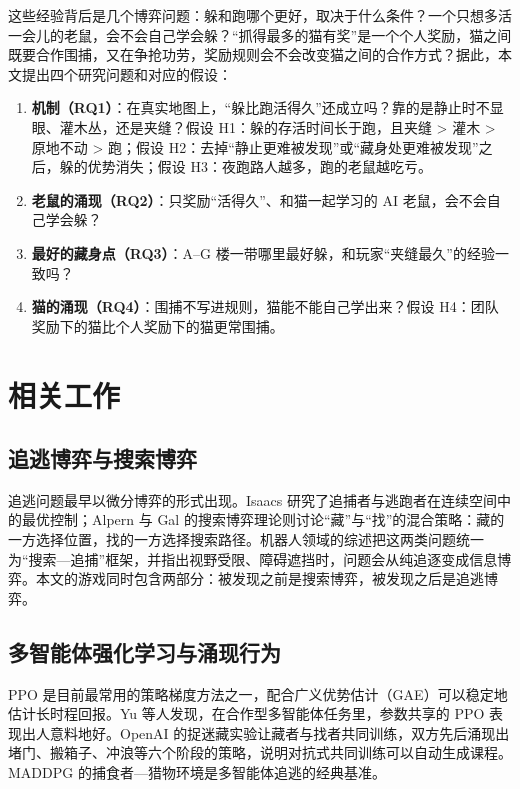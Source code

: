 \documentclass[a4paper,zihao=5,fontset=fandol,UTF8]{ctexart}
\begin{document}
这些经验背后是几个博弈问题：躲和跑哪个更好，取决于什么条件？一个只想多活一会儿的老鼠，会不会自己学会躲？“抓得最多的猫有奖”是一个个人奖励，猫之间既要合作围捕，又在争抢功劳，奖励规则会不会改变猫之间的合作方式？据此，本文提出四个研究问题和对应的假设：

\begin{enumerate}
  \item \textbf{机制（RQ1）}：在真实地图上，“躲比跑活得久”还成立吗？靠的是静止时不显眼、灌木丛，还是夹缝？假设 H1：躲的存活时间长于跑，且夹缝 > 灌木 > 原地不动 > 跑；假设 H2：去掉“静止更难被发现”或“藏身处更难被发现”之后，躲的优势消失；假设 H3：夜跑路人越多，跑的老鼠越吃亏。
  \item \textbf{老鼠的涌现（RQ2）}：只奖励“活得久”、和猫一起学习的 AI 老鼠，会不会自己学会躲？
  \item \textbf{最好的藏身点（RQ3）}：A–G 楼一带哪里最好躲，和玩家“夹缝最久”的经验一致吗？
  \item \textbf{猫的涌现（RQ4）}：围捕不写进规则，猫能不能自己学出来？假设 H4：团队奖励下的猫比个人奖励下的猫更常围捕。
\end{enumerate}

\section{相关工作}
\subsection{追逃博弈与搜索博弈}
追逃问题最早以微分博弈的形式出现。Isaacs 研究了追捕者与逃跑者在连续空间中的最优控制\cite{isaacs1965}；Alpern 与 Gal 的搜索博弈理论则讨论“藏”与“找”的混合策略：藏的一方选择位置，找的一方选择搜索路径\cite{alpern2003}。机器人领域的综述把这两类问题统一为“搜索—追捕”框架，并指出视野受限、障碍遮挡时，问题会从纯追逐变成信息博弈\cite{chung2011}。本文的游戏同时包含两部分：被发现之前是搜索博弈，被发现之后是追逃博弈。

\subsection{多智能体强化学习与涌现行为}
PPO 是目前最常用的策略梯度方法之一\cite{schulman2017ppo}，配合广义优势估计（GAE）可以稳定地估计长时程回报\cite{schulman2016gae}。Yu 等人发现，在合作型多智能体任务里，参数共享的 PPO 表现出人意料地好\cite{yu2022mappo}。OpenAI 的捉迷藏实验让藏者与找者共同训练，双方先后涌现出堵门、搬箱子、冲浪等六个阶段的策略\cite{baker2020}，说明对抗式共同训练可以自动生成课程。MADDPG 的捕食者—猎物环境是多智能体追逃的经典基准\cite{lowe2017}。
\end{document}
